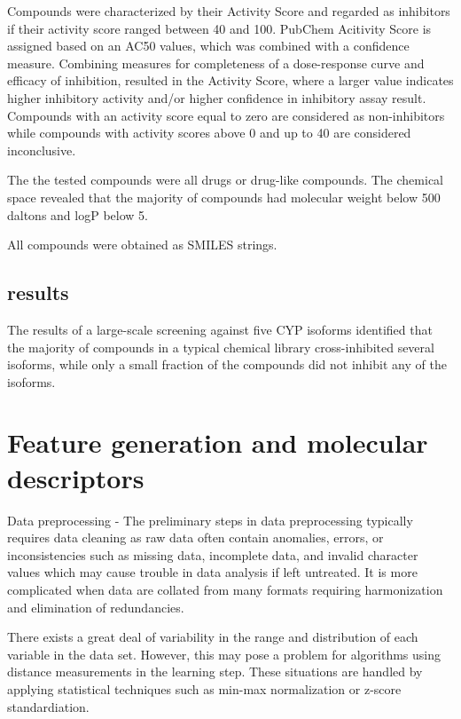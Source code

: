 Compounds were characterized by their Activity Score and regarded as inhibitors if their activity score ranged between 40 and 100. PubChem Acitivity Score is assigned based on an AC50 values, which was combined with a confidence measure. Combining measures for completeness of a dose-response curve and efficacy of inhibition, resulted in the Activity Score, where a larger value indicates higher inhibitory activity and/or higher confidence in inhibitory assay result. Compounds with an activity score equal to zero are considered as non-inhibitors while compounds with activity scores above 0 and up to 40 are considered inconclusive. \cite{Lapins2013}

The the tested compounds were all drugs or drug-like compounds. The chemical space revealed that the majority of compounds had molecular weight below 500 daltons and logP below 5. \cite{Lapins2013}

All compounds were obtained as SMILES strings.

\subsection{results}
The results of a large-scale screening against five CYP isoforms identified that the majority of compounds in a typical chemical library cross-inhibited several isoforms, while only a small fraction of the compounds did not inhibit any of the isoforms. \cite{Veith2009}

\section{Feature generation and molecular descriptors}

Data preprocessing - The preliminary steps in data preprocessing typically requires data cleaning as raw data often contain anomalies, errors, or inconsistencies such as missing data, incomplete data, and invalid character values which may cause trouble in data analysis if left untreated. It is more complicated when data are collated from many formats requiring harmonization and elimination of redundancies.\cite{Nantasenamat2009}

There exists a great deal of variability in the range and distribution of each variable in the data set. However, this may pose a problem for algorithms using distance measurements in the learning step. These situations are handled by applying statistical techniques such as min-max normalization or z-score standardiation. 


